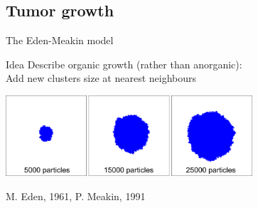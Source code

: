 \documentclass[smaller]{beamer}
\begin{document}
        \subsection{Tumor growth}
            \begin{frame}{The Eden-Meakin model}
                \begin{block}{Idea}
                    Describe organic growth (rather than anorganic):\\
                    Add new clusters size at nearest neighbours
                \end{block}

                \begin{center}
                    \includegraphics[height = 3cm]{img/eden_01.png}

                    \color{gray}M. Eden, 1961, P. Meakin, 1991
                \end{center}
            \end{frame}
\end{document}
